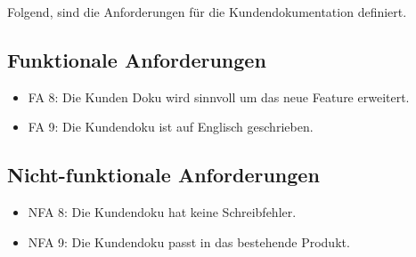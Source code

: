 Folgend, sind die Anforderungen für die Kundendokumentation definiert.

\subsection*{Funktionale Anforderungen}
\begin{itemize}
	\item FA 8: Die Kunden Doku wird sinnvoll um das neue Feature erweitert.
	\item FA 9: Die Kundendoku ist auf Englisch geschrieben.
\end{itemize}

\subsection*{Nicht-funktionale Anforderungen}
\begin{itemize}
	\item NFA 8: Die Kundendoku hat keine Schreibfehler. 
	\item NFA 9: Die Kundendoku passt in das bestehende Produkt.
\end{itemize}